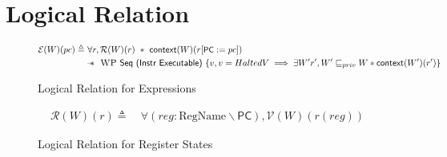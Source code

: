\documentclass[sigplan,review]{acmart}\settopmatter{printfolios=true,printccs=false,printacmref=false}
\newcommand{\sep}{-\kern-.6em\raisebox{-.659ex}{*}\ }
\newcommand{\interp}[2]{(#1)(#2)}
\begin{document}
\section{Logical Relation}
\begin{figure*}[ht]
	\begin{minipage}{\textwidth}
	\begin{align*}
		\mathcal{E}\interp{W}{pc} \triangleq&~\forall r, \mathcal{R}(W)(r) ~*~\textsf{context}(W)(r[\textsf{\small PC}:=pc])\\
		&\sep~\textsc{WP}~\textsf{Seq (Instr Executable)}~\{ v, v = HaltedV \implies \exists W' r', W' \sqsubseteq_{priv} W * \textsf{context}(W')(r')\}
	\end{align*}
	\end{minipage}
	\caption{Logical Relation for Expressions}
	\label{fig:expr}
\end{figure*}

\begin{figure*}[ht]
	\begin{minipage}{\textwidth}
	\begin{align*}
		\mathcal{R}\interp{W}{r} \triangleq&~\forall (reg : \text{RegName} \backslash \textsf{PC}), \mathcal{V}\interp{W}{r(reg)}
	\end{align*}
	\end{minipage}
	\caption{Logical Relation for Register States}
	\label{fig:regs}
\end{figure*}
\end{document}
